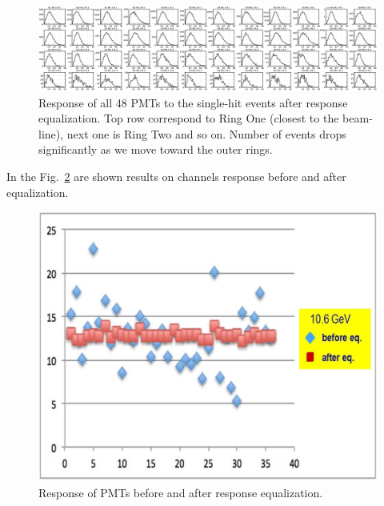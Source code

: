 \begin{figure}[h]
\centering
\includegraphics[width=0.99\linewidth]{images/nphePMT6595.png}
\caption{Response of all 48 PMTs to the single-hit events after response equalization. Top row correspond to Ring One (closest to the beam-line), next one is Ring Two and so on. Number of events drops significantly as we move toward the outer rings.}
\label{fig:htccSinglePmtResponce}
\end{figure}

In the Fig.~\ref{fig:NICK_svodni} are shown results on channels response before and after equalization.

\begin{figure}[h]
\centering
\includegraphics[width=0.99\linewidth]{images/NICK_svodni.jpg}
\caption{Response of PMTs before and after response equalization.}
\label{fig:NICK_svodni}
\end{figure}

